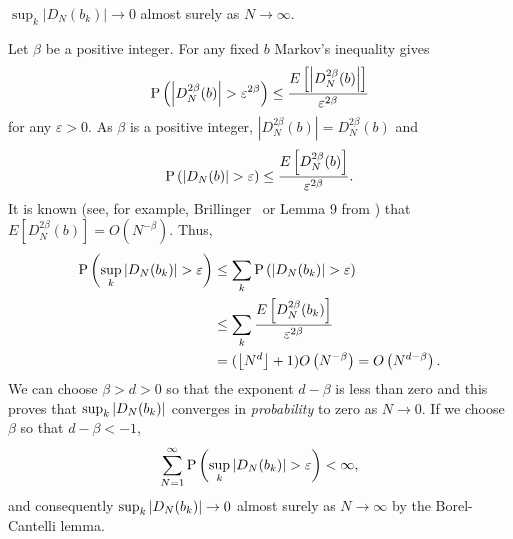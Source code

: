\documentclass[journal]{IEEEtran}
\begin{document}
\begin{lemma} \label{lem:DNij->0}
$\sup_{k}\vert D_N(b_k)\vert \rightarrow 0$ almost surely as $N\rightarrow \infty$.
 \end{lemma}
\begin{IEEEproof}
Let $\beta$ be a positive integer.  For any fixed $b$ Markov's inequality gives
\[
 \operatorname{P}\left(\left\vert D_N^{2\beta}(b) \right\vert > \varepsilon^{2\beta}\right) \leq \frac{E\left[  \left\vert D_{N}^{2\beta}(b) \right\vert \right]  }{\varepsilon^{2\beta}}
\] 
for any $\varepsilon > 0$. As $\beta$ is a positive integer, $\left|D_N^{2\beta}(b)\right| = D_{N}^{2\beta}(b)$ and
\[
\operatorname{P}\left(\left\vert D_N(b) \right\vert > \varepsilon\right) \leq \frac{E \left[ D_N^{2\beta}(b) \right] }{\varepsilon^{2\beta}}.
\]
It is known (see, for example, Brillinger~\cite{Brillinger1962_moment_bounds_iid} or Lemma 9 from \cite{McKilliamFrequencyEstimationByPhaseUnwrapping2009}) that $E\left[ D_N^{2\beta}(b) \right] = O\left(N^{-\beta}\right)$.  Thus,
 \begin{align*}
 \operatorname{P}\left(  \sup_{k}{\left| D_N(b_k) \right|} >\varepsilon\right)  &\leq \sum_{k } \operatorname{P} \left( {\left| D_N(b_k) \right|} >\varepsilon\right) \\
 &\leq \sum_{k } \frac{E \left[ D_N^{2\beta}(b_k) \right] }{\varepsilon^{2\beta}} \\
&= ({\left\lfloor N^d \right\rfloor} + 1)O\left(N^{-\beta}\right) = O\left(N^{d - \beta}\right).
\end{align*}
We can choose $\beta > d > 0$ so that the exponent $d - \beta$ is less than zero and this proves that $\sup_{k }{\left| D_N(b_k) \right|}$ converges in \emph{probability} to zero as $N \rightarrow 0$. If we choose $\beta$ so that $d - \beta < -1$,
\[
 \sum_{N=1}^{\infty}\operatorname{P}\left(  \sup_{k }{\left| D_N(b_k) \right|} >\varepsilon\right) < \infty,
\]
and consequently $\sup_{k }{\left|  D_N(b_k) \right|} \rightarrow 0$ almost surely as $N\rightarrow\infty$ by the Borel-Cantelli lemma.%
\end{IEEEproof}
\end{document}
